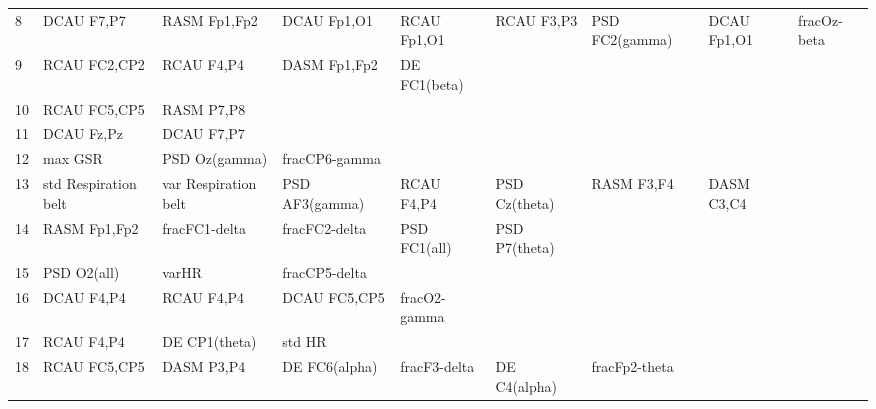 \begin{landscape}
\begin{table}[]
\begin{tabular}{l|llllllll}
8                  & DCAU F7,P7           & RASM Fp1,Fp2            & DCAU Fp1,O1          & RCAU Fp1,O1        & RCAU F3,P3            & PSD FC2(gamma)       & DCAU Fp1,O1     & fracOz-beta     \\
9                  & RCAU FC2,CP2         & RCAU F4,P4              & DASM Fp1,Fp2         & DE FC1(beta)       &                       &                      &                 &                 \\
10                 & RCAU FC5,CP5         & RASM P7,P8              &                      &                    &                       &                      &                 &                 \\
11                 & DCAU Fz,Pz           & DCAU F7,P7              &                      &                    &                       &                      &                 &                 \\
12                 & max GSR              & PSD Oz(gamma)           & fracCP6-gamma        &                    &                       &                      &                 &                 \\
13                 & std Respiration belt & var Respiration belt    & PSD AF3(gamma)       & RCAU F4,P4         & PSD Cz(theta)         & RASM F3,F4           & DASM C3,C4      &                 \\
14                 & RASM Fp1,Fp2         & fracFC1-delta           & fracFC2-delta        & PSD FC1(all)       & PSD P7(theta)         &                      &                 &                 \\
15                 & PSD O2(all)          & varHR                   & fracCP5-delta        &                    &                       &                      &                 &                 \\
16                 & DCAU F4,P4           & RCAU F4,P4              & DCAU FC5,CP5         & fracO2-gamma       &                       &                      &                 &                 \\
17                 & RCAU F4,P4           & DE CP1(theta)           & std HR               &                    &                       &                      &                 &                 \\
18                 & RCAU FC5,CP5         & DASM P3,P4              & DE FC6(alpha)        & fracF3-delta       & DE C4(alpha)          & fracFp2-theta        &                 &                 \\

\end{tabular}
\end{table}
\end{landscape}
